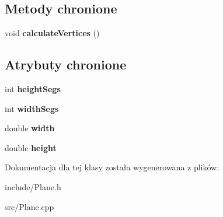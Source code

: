 \subsection*{Metody chronione}
\begin{DoxyCompactItemize}
\item 
\hypertarget{class_swift_1_1_plane_a2a91b7615a5905cbf23c77b4802eac95}{void {\bfseries calculate\-Vertices} ()}\label{class_swift_1_1_plane_a2a91b7615a5905cbf23c77b4802eac95}

\end{DoxyCompactItemize}
\subsection*{Atrybuty chronione}
\begin{DoxyCompactItemize}
\item 
\hypertarget{class_swift_1_1_plane_aeb428fb89663547df455e8f4f5a63086}{int {\bfseries height\-Segs}}\label{class_swift_1_1_plane_aeb428fb89663547df455e8f4f5a63086}

\item 
\hypertarget{class_swift_1_1_plane_a5620fcdf357be2c71506a3688adb2f58}{int {\bfseries width\-Segs}}\label{class_swift_1_1_plane_a5620fcdf357be2c71506a3688adb2f58}

\item 
\hypertarget{class_swift_1_1_plane_a9098b81cd7e15b866a4ae9f77fdcfd79}{double {\bfseries width}}\label{class_swift_1_1_plane_a9098b81cd7e15b866a4ae9f77fdcfd79}

\item 
\hypertarget{class_swift_1_1_plane_aa5ddc56c4285b3aa3da7340aef2757d3}{double {\bfseries height}}\label{class_swift_1_1_plane_aa5ddc56c4285b3aa3da7340aef2757d3}

\end{DoxyCompactItemize}


Dokumentacja dla tej klasy została wygenerowana z plików\-:\begin{DoxyCompactItemize}
\item 
include/Plane.\-h\item 
src/Plane.\-cpp\end{DoxyCompactItemize}
